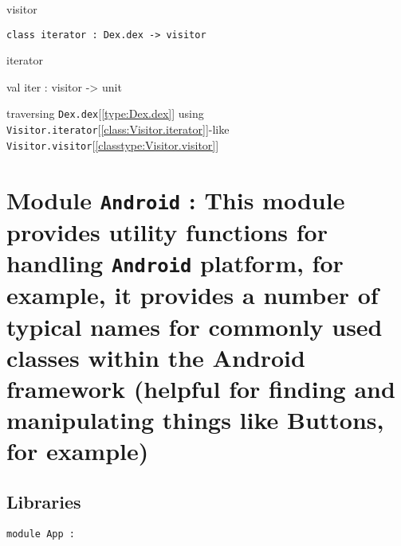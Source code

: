 \documentclass[11pt]{article}
\begin{document}
\begin{ocamldocdescription}
visitor


\end{ocamldocdescription}




\begin{ocamldoccode}
{\tt{class iterator : }}{\tt{Dex.dex -> }}{\tt{visitor}}\end{ocamldoccode}
\label{class:Visitor.iterator}



\begin{ocamldocdescription}
iterator


\end{ocamldocdescription}




\label{val:Visitor.iter}\begin{ocamldoccode}
val iter : visitor -> unit
\end{ocamldoccode}
\begin{ocamldocdescription}
traversing {\tt{Dex.dex}}[\ref{type:Dex.dex}] using {\tt{Visitor.iterator}}[\ref{class:Visitor.iterator}]-like {\tt{Visitor.visitor}}[\ref{classtype:Visitor.visitor}]


\end{ocamldocdescription}


\section{Module {\tt{Android}} : This module provides utility functions for handling {\tt{Android}}
    platform, for example, it provides a number of typical names for
    commonly used classes within the Android framework (helpful for
    finding and manipulating things like Buttons, for example)}
\label{module:Android}




\ocamldocvspace{0.5cm}



\subsection{Libraries}




\begin{ocamldoccode}
{\tt{module }}{\tt{App}}{\tt{ : }}\end{ocamldoccode}
\label{module:Android.App}
\end{document}
